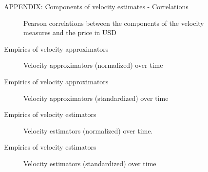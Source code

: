 \documentclass[]{beamer}
\begin{document}

\begin{frame}{APPENDIX: Components of velocity estimates - Correlations}
  \begin{figure}[h]
    \centering
    \caption{Pearson correlations between the components of the velocity measures and the price in USD}
    \label{fig: Corrleation of components of velocity estimators}
  \end{figure}
\end{frame}



\begin{frame}{Empirics of velocity approximators}
  \begin{figure}[h]
    \centering
    \caption{Velocity approximators (normalized) over time}
    \label{fig: Velocity approximators (normalized) over time}
  \end{figure}
\end{frame}

\begin{frame}{Empirics of velocity approximators}
  \begin{figure}[h]
    \centering
    \caption{Velocity approximators (standardized) over time}
    \label{fig: Velocity approximators (standardized) over time}
  \end{figure}
\end{frame}

\begin{frame}{Empirics of velocity estimators}
  \begin{figure}[h]
    \centering
    \caption{Velocity estimators (normalized) over time.}
    \label{fig: Velocity estimators (normalized) over time}
  \end{figure}
\end{frame}

\begin{frame}{Empirics of velocity estimators}
  \begin{figure}[h]
    \centering
    \caption{Velocity estimators (standardized) over time}
    \label{fig: Velocity estimators (standardized) over time}
  \end{figure}
\end{frame}
\end{document}
